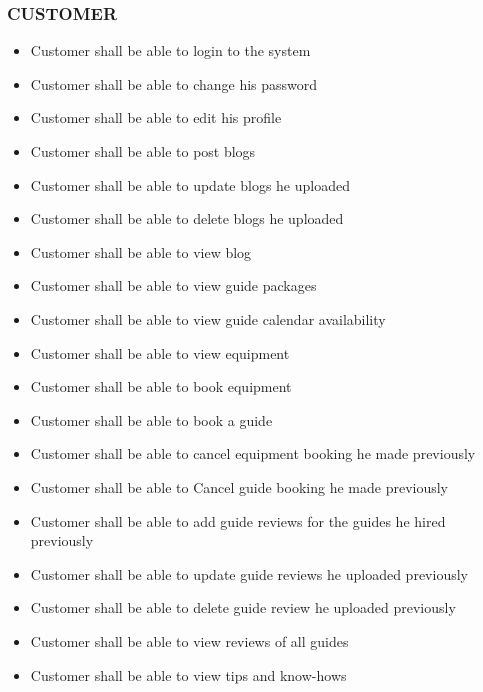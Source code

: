 \subsubsection*{CUSTOMER}
\begin{itemize}
\itemsep0em 
    \item Customer shall be able to login to the system
    \item Customer shall be able to change his password 
    \item Customer shall be able to edit his profile
    \item Customer shall be able to post blogs
    \item Customer shall be able to update blogs he uploaded
    \item Customer shall be able to delete blogs he uploaded
    \item Customer shall be able to view blog
    \item Customer shall be able to view guide packages
    \item Customer shall be able to view guide calendar availability
    \item Customer shall be able to view equipment
    \item Customer shall be able to book equipment
    \item Customer shall be able to book a guide
    \item Customer shall be able to cancel equipment booking he made previously
    \item Customer shall be able to Cancel guide booking he made previously
    \item Customer shall be able to add guide reviews for the guides he hired previously
    \item Customer shall be able to update guide reviews he uploaded previously
    \item Customer shall be able to delete guide review he uploaded previously
    \item Customer shall be able to view reviews of all guides
    \item Customer shall be able to view tips and know-hows
\end{itemize}

